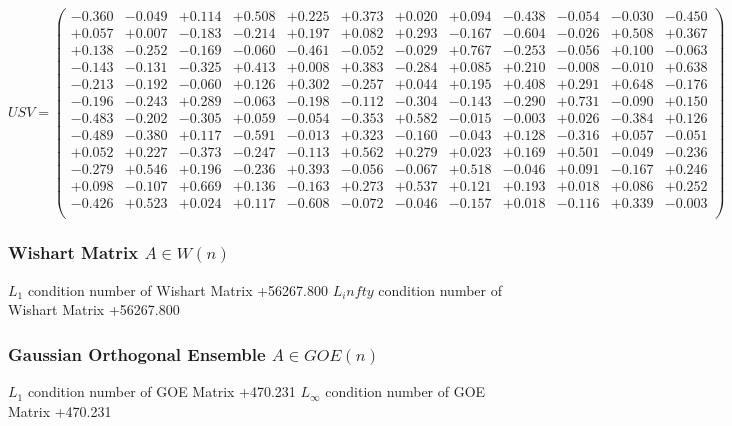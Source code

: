 \documentclass[9pt]{article}
\theoremstyle{plain}
\theoremstyle{definition}
\theoremstyle{remark}
\numberwithin{equation}{section}
\begin{document}
$U S V = \left(
\begin{array}{
cccccccccccc}
-0.360 & -0.049 & +0.114 & +0.508 & +0.225 & +0.373 & +0.020 & +0.094 & -0.438 & -0.054 & -0.030 & -0.450 \\
+0.057 & +0.007 & -0.183 & -0.214 & +0.197 & +0.082 & +0.293 & -0.167 & -0.604 & -0.026 & +0.508 & +0.367 \\
+0.138 & -0.252 & -0.169 & -0.060 & -0.461 & -0.052 & -0.029 & +0.767 & -0.253 & -0.056 & +0.100 & -0.063 \\
-0.143 & -0.131 & -0.325 & +0.413 & +0.008 & +0.383 & -0.284 & +0.085 & +0.210 & -0.008 & -0.010 & +0.638 \\
-0.213 & -0.192 & -0.060 & +0.126 & +0.302 & -0.257 & +0.044 & +0.195 & +0.408 & +0.291 & +0.648 & -0.176 \\
-0.196 & -0.243 & +0.289 & -0.063 & -0.198 & -0.112 & -0.304 & -0.143 & -0.290 & +0.731 & -0.090 & +0.150 \\
-0.483 & -0.202 & -0.305 & +0.059 & -0.054 & -0.353 & +0.582 & -0.015 & -0.003 & +0.026 & -0.384 & +0.126 \\
-0.489 & -0.380 & +0.117 & -0.591 & -0.013 & +0.323 & -0.160 & -0.043 & +0.128 & -0.316 & +0.057 & -0.051 \\
+0.052 & +0.227 & -0.373 & -0.247 & -0.113 & +0.562 & +0.279 & +0.023 & +0.169 & +0.501 & -0.049 & -0.236 \\
-0.279 & +0.546 & +0.196 & -0.236 & +0.393 & -0.056 & -0.067 & +0.518 & -0.046 & +0.091 & -0.167 & +0.246 \\
+0.098 & -0.107 & +0.669 & +0.136 & -0.163 & +0.273 & +0.537 & +0.121 & +0.193 & +0.018 & +0.086 & +0.252 \\
-0.426 & +0.523 & +0.024 & +0.117 & -0.608 & -0.072 & -0.046 & -0.157 & +0.018 & -0.116 & +0.339 & -0.003 \\
\end{array}
\right)$ \newline 

\subsubsection{Wishart Matrix $A \in W(n)$}
$L_1$ condition number of Wishart Matrix +56267.800
$L_infty$ condition number of Wishart Matrix +56267.800
\subsubsection{Gaussian Orthogonal Ensemble $A \in GOE(n)$}
$L_1$ condition number of GOE Matrix +470.231
$L_\infty$ condition number of GOE Matrix +470.231
\end{document}
